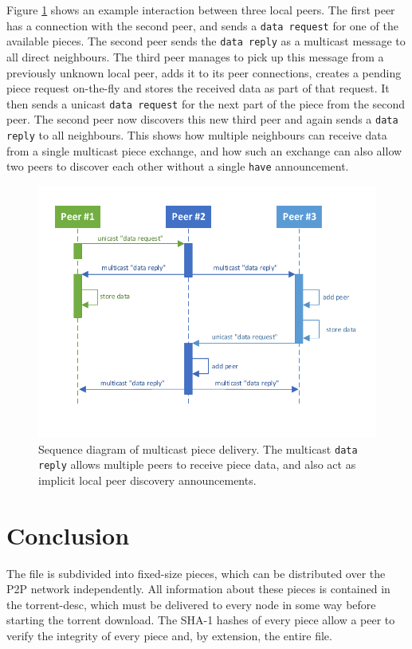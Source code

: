 Figure \ref{fig:distribution:multicast} shows an example interaction between three local peers. The first peer has a connection with the second peer, and sends a \texttt{data request} for one of the available pieces. The second peer sends the \texttt{data reply} as a multicast message to all direct neighbours. The third peer manages to pick up this message from a previously unknown local peer, adds it to its peer connections, creates a pending piece request on-the-fly and stores the received data as part of that request. It then sends a unicast \texttt{data request} for the next part of the piece from the second peer. The second peer now discovers this new third peer and again sends a \texttt{data reply} to all neighbours. This shows how multiple neighbours can receive data from a single multicast piece exchange, and how such an exchange can also allow two peers to discover each other without a single \texttt{have} announcement.

\begin{figure}
    \centering
    \includegraphics[width=\textwidth]{diagrams/piece-exchange.pdf}
    \caption[Sequence diagram of multicast piece delivery]{Sequence diagram of multicast piece delivery. The multicast \texttt{data reply} allows multiple peers to receive piece data, and also act as implicit local peer discovery announcements.}
    \label{fig:distribution:multicast}
\end{figure}

\section{Conclusion}
\label{sec:distrib:conclusion}
The file is subdivided into fixed-size pieces, which can be distributed over the \gls{P2P} network independently. All information about these pieces is contained in the \gls{torrent-desc}, which must be delivered to every node in some way before starting the torrent download. The SHA-1 hashes of every piece allow a peer to verify the integrity of every piece and, by extension, the entire file.

